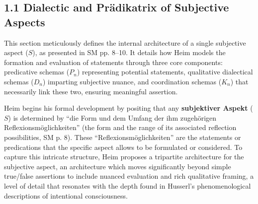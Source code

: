 \documentclass[12pt]{article}
\newcommand{\q}[1]{\enquote{#1}}
\newcommand{\subjektiveraspekt}{S}
\newcommand{\pradikatrix}{P}
\newcommand{\dialektik}{D}
\newcommand{\koordination}{K}
\begin{document}
\subsection{1.1 Dialectic and Prädikatrix of Subjective Aspects}
\label{sec:dialektik_pradikatrix}

This section meticulously defines the internal architecture of a single subjective aspect (\(\subjektiveraspekt\)), as presented in SM pp. 8--10. It details how Heim models the formation and evaluation of statements through three core components: predicative schemas (\(\pradikatrix_n\)) representing potential statements, qualitative dialectical schemas (\(\dialektik_n\)) imparting subjective nuance, and coordination schemas (\(\koordination_n\)) that necessarily link these two, ensuring meaningful assertion.

Heim begins his formal development by positing that any \textbf{subjektiver Aspekt} (\(\subjektiveraspekt\)) is determined by \q{die Form und dem Umfang der ihm zugehörigen Reflexionsmöglichkeiten} (the form and the range of its associated reflection possibilities, SM p. 8). These \q{Reflexionsmöglichkeiten} are the statements or predications that the specific aspect allows to be formulated or considered. To capture this intricate structure, Heim proposes a tripartite architecture for the subjective aspect, an architecture which moves significantly beyond simple true/false assertions to include nuanced evaluation and rich qualitative framing, a level of detail that resonates with the depth found in Husserl's phenomenological descriptions of intentional consciousness.
\end{document}
